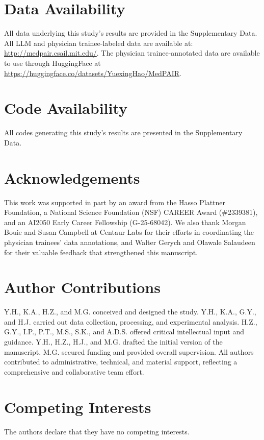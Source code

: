 \documentclass[fleqn,10pt]{wlscirep}
\begin{document}
\section{Data Availability}
All data underlying this study’s results are provided in the Supplementary Data. All LLM and physician trainee-labeled data are available at: \url{http://medpair.csail.mit.edu/}. The physician trainee-annotated data are available to use through HuggingFace at \url{https://huggingface.co/datasets/YuexingHao/MedPAIR}.

\section{Code Availability}
All codes generating this study’s results are presented in the Supplementary Data. 

\section{Acknowledgements}
This work was supported in part by an award from the Hasso Plattner Foundation, a National Science Foundation (NSF) CAREER Award (\#2339381), and an AI2050 Early Career Fellowship (G-25-68042). We also thank Morgan Bouie and Susan Campbell at Centaur Labs for their efforts in coordinating the physician trainees’ data annotations, and Walter Gerych and Olawale Salaudeen for their valuable feedback that strengthened this manuscript.

\section{Author Contributions}

Y.H., K.A., H.Z., and M.G. conceived and designed the study. Y.H., K.A., G.Y., and H.J. carried out data collection, processing, and experimental analysis. H.Z., G.Y., I.P., P.T., M.S., S.K., and A.D.S. offered critical intellectual input and guidance. Y.H., H.Z., H.J., and M.G. drafted the initial version of the manuscript. M.G. secured funding and provided overall supervision. All authors contributed to administrative, technical, and material support, reflecting a comprehensive and collaborative team effort.

\section{Competing Interests}
The authors declare that they have no competing interests.



\end{document}
